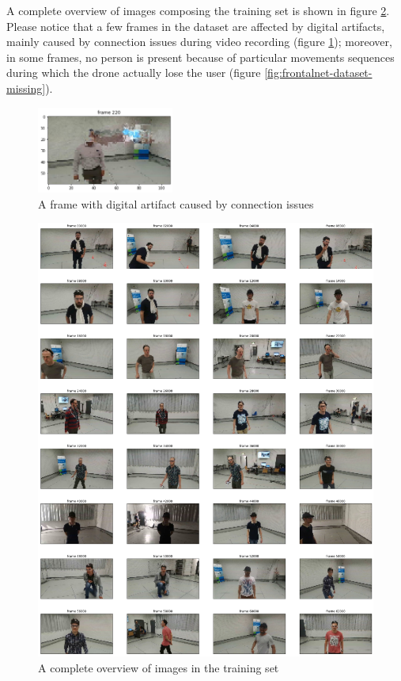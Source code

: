 A complete overview of images composing the training set is shown in figure \ref{fig:frontalnet-dataset-overview}. Please notice that a few frames in the dataset are affected by digital artifacts, mainly caused by connection issues during video recording (figure \ref{fig:frontalnet-dataset-glitch}); moreover, in some frames, no person is present because of particular movements sequences during which the drone actually lose the user (figure \ref{fig:frontalnet-dataset-missing}).

\begin{figure}[!htb]
	\centering
	\includegraphics[width=0.4\textwidth]{"contents/images/03-data-glitch"}
	\caption[A frame with digital artifact caused by connection issues]{A frame with digital artifact caused by connection issues}
	\label{fig:frontalnet-dataset-glitch}
\end{figure}

\clearpage
\vspace*{5ex}
\begin{figure}[!h]
	\centering
	\includegraphics[width=1\textwidth]{"contents/images/03-data-overview"}
	\caption[A complete overview of images in the training set]{A complete overview of images in the training set}
	\label{fig:frontalnet-dataset-overview}
\end{figure}
\clearpage

